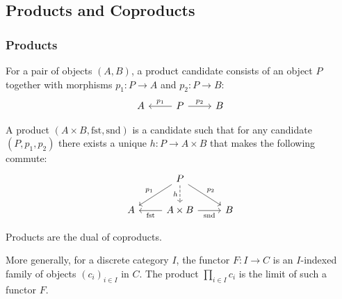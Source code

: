 \subsection{Products and Coproducts}

\subsubsection*{Products}

\begin{definition}

	For a pair of objects $(A, B)$, a product candidate consists of an object $P$
	together with morphisms $p_1: P\to A$ and $p_2:P\to B$:
	\[\begin{tikzcd}[ampersand replacement=\&]
		A \& P \& B
		\arrow["{p_1}"', from=1-2, to=1-1]
		\arrow["{p_2}", from=1-2, to=1-3]
	\end{tikzcd}\]

	A product $(A\times B, \mathrm{fst}, \mathrm{snd})$ is a candidate such that
	for any candidate $(P, p_1, p_2)$ there exists a unique $h: P\to A\times B$
	that makes the following commute:
	\parencite{leinster:basic_category_theory}
	\[\begin{tikzcd}[ampersand replacement=\&]
		\& P \\
		A \& {A\times B} \& B
		\arrow["{\mathrm{fst}}", from=2-2, to=2-1]
		\arrow["{\mathrm{snd}}"', from=2-2, to=2-3]
		\arrow["{p_1}"', from=1-2, to=2-1]
		\arrow["{p_2}", from=1-2, to=2-3]
		\arrow["h"', dashed, from=1-2, to=2-2]
	\end{tikzcd}\]
\end{definition}

\begin{remark}
	Products are the dual of coproducts.
\end{remark}

\begin{definition}

	More generally, for a discrete category $I$, the functor $F:I\to C$ is an
	$I$-indexed family of objects $(c_i)_{i\in I}$ in $C$. The product
	$\prod_{i\in I} c_i$ is the limit of such a functor $F$.
	\parencite{leinster:basic_category_theory}
\end{definition}


